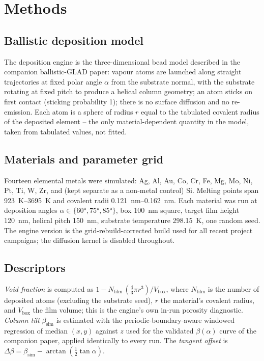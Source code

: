 \documentclass[aip,jcp,amsmath,amssymb,reprint]{revtex4-1}
\begin{document}
\section{Methods}
\label{sec:methods}

\subsection{Ballistic deposition model}
The deposition engine is the three-dimensional bead model described in the
companion ballistic-GLAD paper: vapour atoms are launched along straight
trajectories at fixed polar angle $\alpha$ from the substrate normal, with the
substrate rotating at fixed pitch to produce a helical column geometry; an atom
sticks on first contact (sticking probability \num{1}); there is no surface
diffusion and no re-emission. Each atom is a sphere of radius $r$ equal to the
tabulated covalent radius of the deposited element -- the only material-dependent
quantity in the model, taken from tabulated values, not fitted.

\subsection{Materials and parameter grid}
Fourteen elemental metals were simulated: Ag, Al, Au, Co, Cr, Fe, Mg, Mo, Ni,
Pt, Ti, W, Zr, and (kept separate as a non-metal control) Si. Melting points
span \SIrange{923}{3695}{K} and covalent radii
\SIrange{0.121}{0.162}{nm}. Each material was run at deposition angles
$\alpha \in \{\ang{60}, \ang{75}, \ang{85}\}$, box \SI{100}{nm} square,
target film height \SI{120}{nm}, helical pitch \SI{150}{nm}, substrate
temperature \SI{298.15}{K}, one random seed. The engine version is the
grid-rebuild-corrected build used for all recent project campaigns; the
diffusion kernel is disabled throughout.

\subsection{Descriptors}
\emph{Void fraction} is computed as
$1 - N_\mathrm{film}\,(\tfrac{4}{3}\pi r^{3}) / V_\mathrm{box}$, where
$N_\mathrm{film}$ is the number of deposited atoms (excluding the substrate
seed), $r$ the material's covalent radius, and $V_\mathrm{box}$ the film volume;
this is the engine's own in-run porosity diagnostic. \emph{Column tilt}
$\beta_\mathrm{sim}$ is estimated with the periodic-boundary-aware windowed
regression of median $(x,y)$ against $z$ used for the validated $\beta(\alpha)$
curve of the companion paper, applied identically to every run. The
\emph{tangent offset} is
$\Delta\beta = \beta_\mathrm{sim} - \arctan(\tfrac{1}{2}\tan\alpha)$.
\end{document}
